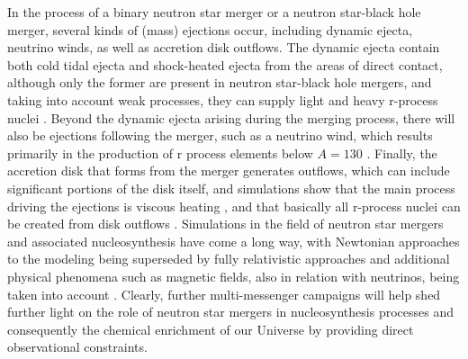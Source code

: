 \documentclass[a4paper,11pt]{article}
\begin{document}
In the process of a binary neutron star merger or a neutron star-black hole merger, several kinds of (mass) ejections occur, including dynamic ejecta, neutrino winds, as well as accretion disk outflows. The dynamic ejecta contain both cold tidal ejecta and shock-heated ejecta from the areas of direct contact, although only the former are present in neutron star-black hole mergers, and taking into account weak processes, they can supply light and heavy r-process nuclei \citep{wanajo14,martin18}. Beyond the dynamic ejecta arising during the merging process, there will also be ejections following the merger, such as a neutrino wind, which results primarily in the production of r process elements below $A=130$ \citep{martin15}. Finally, the accretion disk that forms from the merger generates outflows, which can include significant portions of the disk itself, and simulations show that the main process driving the ejections is viscous heating \citep{just15}, and that basically all r-process nuclei can be created from disk outflows \citep{wu17}. Simulations in the field of neutron star mergers and associated nucleosynthesis have come a long way, with Newtonian approaches to the modeling being superseded by fully relativistic approaches \citep[see, e.g.,][]{baiotti17,papenfort18,bovard17} and additional physical phenomena such as magnetic fields, also in relation with neutrinos, being taken into account \citep[see, e.g.,][]{giacomazzo15,guilet17,giacomazzo09}. Clearly, further multi-messenger campaigns will help shed further light on the role of neutron star mergers in nucleosynthesis processes and consequently the chemical enrichment of our Universe by providing direct observational constraints.\\ \\
%
\end{document}
